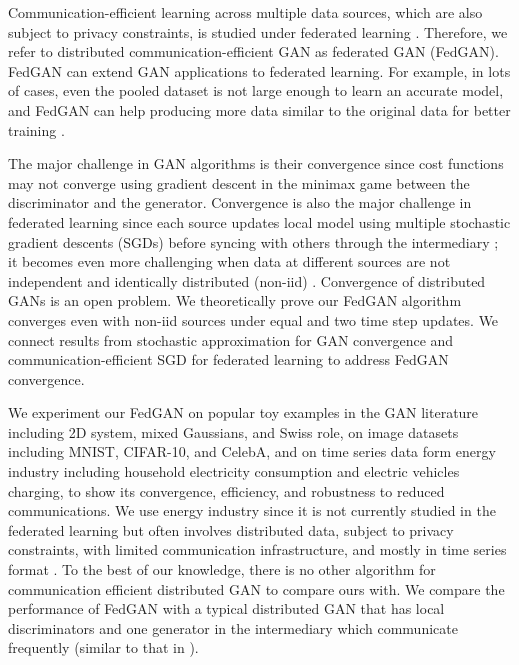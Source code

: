 \documentclass{article}
\begin{document}
Communication-efficient learning across multiple data sources, which are also subject to privacy constraints, is studied under federated learning \citep{konevcnyEtal-16arXiv, McmahanEtal-16arXiv}. Therefore, we refer to distributed communication-efficient GAN as federated GAN (FedGAN). FedGAN can extend GAN applications to federated learning. For example, in lots of cases, even the pooled dataset is not large enough to learn an accurate model, and FedGAN can help producing more data similar to the original data for better training \citep{bowles2018gan}.



The major challenge in GAN algorithms is their convergence since cost functions may not converge using gradient descent in the minimax game between the discriminator and the generator. Convergence is also the major challenge in federated learning since each source updates local model using multiple stochastic gradient descents (SGDs) before syncing with others through the intermediary \citep{dinh2019federated}; it becomes even more challenging when data at different sources are not independent and identically distributed (non-iid) \citep{wang2019adaptive}. Convergence of distributed GANs is an open problem. We theoretically prove our FedGAN algorithm converges even with non-iid  sources under equal and two time step updates. We connect results from stochastic approximation for GAN convergence and communication-efficient SGD for federated learning to address FedGAN convergence.

We experiment our FedGAN on popular toy examples in the GAN literature including 2D system, mixed Gaussians, and Swiss role, on image datasets including MNIST, CIFAR-10, and CelebA, and on time series data form energy industry including household electricity consumption and electric vehicles charging, to show its convergence, efficiency, and robustness to reduced communications. We use energy industry since it is not currently studied in the federated learning but often involves distributed data, subject to privacy constraints, with limited communication infrastructure, and mostly in time series format \citep{stankovic2016measuring,balachandran2014bandwidth}. To the best of our knowledge, there is no other algorithm for communication efficient distributed GAN to compare ours with. We compare the performance of FedGAN with a typical distributed GAN that has local discriminators and one generator in the intermediary which communicate frequently (similar to that in \citep{augenstein2019generative}).
\end{document}
